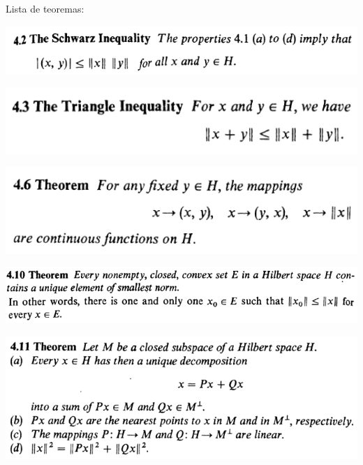 \documentclass[12pt]{article}
\begin{document}
Lista de teoremas:

		\begin{center}
		\includegraphics{4ponto2}
		\end{center}

		\begin{center}
		\includegraphics{4ponto3}
		\end{center}

		\begin{center}
		\includegraphics{4ponto6}
		\end{center}

		\begin{center}
		\includegraphics{4ponto10}
		\end{center}

		\begin{center}
		\includegraphics{4ponto11}
		\end{center}
\end{document}
